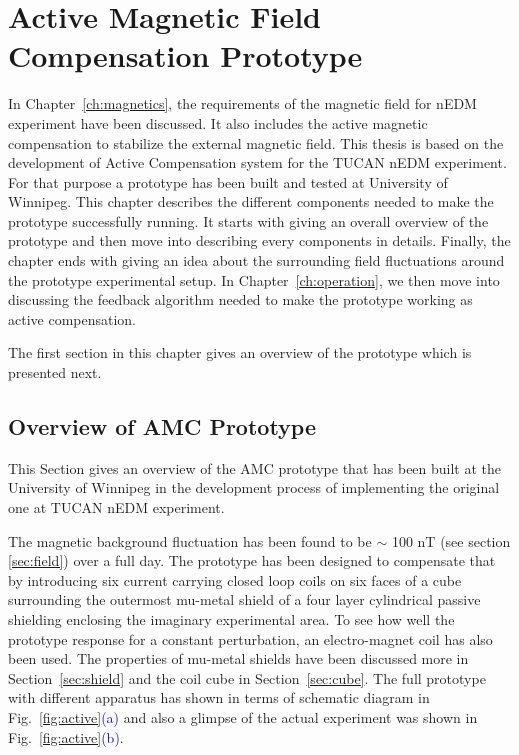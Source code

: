 \chapter{Active Magnetic Field Compensation Prototype}\label{ch:amcP}

In Chapter~\ref{ch:magnetics}, the requirements of the magnetic field for nEDM experiment have been discussed. It also includes the active magnetic compensation to stabilize the external magnetic field. This thesis is based on the development of Active Compensation system for the TUCAN nEDM experiment. For that purpose a prototype has been built and tested at University of Winnipeg. This chapter describes the different components needed to make the prototype successfully running. It starts with giving an overall overview of the prototype and then move into describing every components in details. Finally, the chapter ends with giving an idea about the surrounding field fluctuations around the prototype experimental setup. In Chapter~\ref{ch:operation}, we then move into discussing the feedback algorithm needed to make the prototype working as active compensation.

The first section in this chapter gives an overview of the prototype which is presented next.



\section{Overview of AMC Prototype}\label{sec:amcp_overview}
This Section gives an overview of the AMC prototype that has been built at the University of Winnipeg in the development process of implementing the original one at TUCAN nEDM experiment.

The magnetic background fluctuation has been found to be $\sim$ 100 nT (see section \ref{sec:field}) over a full day. The prototype has been designed to compensate that by introducing six current carrying closed loop coils on six faces of a cube surrounding the outermost mu-metal shield of a four layer cylindrical passive shielding enclosing the imaginary experimental area. To see how well the prototype response for a constant perturbation, an electro-magnet coil has also been used. The properties of mu-metal shields have been discussed more in Section~\ref{sec:shield} and the coil cube in Section~\ref{sec:cube}. The full prototype with different apparatus has shown in terms of schematic diagram in Fig.~\ref{fig:active}\textcolor{blue}{(a)} and also a glimpse of the actual experiment was shown in Fig.~\ref{fig:active}\textcolor{blue}{(b)}.

